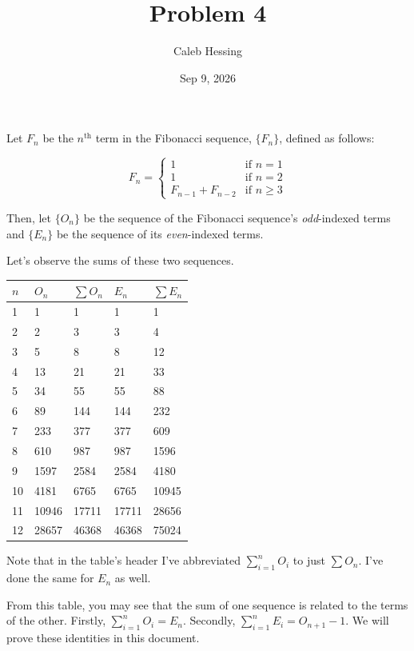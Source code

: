 \documentclass{article} %
\title{Problem 4}
\author{Caleb Hessing}
\date{Sep 9, 2026}
\begin{document}
\maketitle

Let $F_n$ be the $n^\text{th}$ term in the Fibonacci sequence, $\{F_n\}$, defined as follows:

\[
  F_n = \begin{cases}
    1                 & \text{if } n = 1 \\
    1                 & \text{if } n = 2 \\
    F_{n-1} + F_{n-2} & \text{if } n \ge 3
  \end{cases}
\]

Then, let $\{O_n\}$ be the sequence of the Fibonacci sequence's \textit{odd}-indexed terms and
$\{E_n\}$ be the sequence of its \textit{even}-indexed terms.

Let's observe the sums of these two sequences. 

\begin{table}[h]
  \centering
  \begin{tabular}{lllll}
    \toprule
    $n$ & $O_n$ & $\sum O_n$ & $E_n$ & $\sum E_n$ \\
    \midrule
    1  & 1     & 1     & 1     & 1     \\
    2  & 2     & 3     & 3     & 4     \\
    3  & 5     & 8     & 8     & 12    \\
    4  & 13    & 21    & 21    & 33    \\
    5  & 34    & 55    & 55    & 88    \\
    6  & 89    & 144   & 144   & 232   \\
    7  & 233   & 377   & 377   & 609   \\
    8  & 610   & 987   & 987   & 1596  \\
    9  & 1597  & 2584  & 2584  & 4180  \\
    10 & 4181  & 6765  & 6765  & 10945 \\
    11 & 10946 & 17711 & 17711 & 28656 \\
    12 & 28657 & 46368 & 46368 & 75024 \\
    \bottomrule
  \end{tabular}
\end{table}

Note that in the table's header I've abbreviated $\sum_{i=1}^{n} O_i$ to just $\sum O_n$. I've done the same for $E_n$ as well.

From this table, you may see that the sum of one sequence is related to the terms of the other. 
Firstly, $\sum_{i=1}^{n} O_i = E_n$.
Secondly, $\sum_{i=1}^{n} E_i = O_{n+1}-1$.
We will prove these identities in this document.
\end{document}
